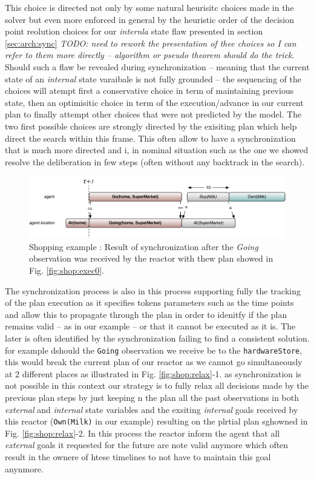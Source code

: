 This choice is directed not only by some natural heurisitc
choices made in the solver but even more enforced in general by the
heuristic order of the decision point reolution choices for our {\em
  internla} state flaw presented in section \ref{sec:arch:sync}
{\em\color{red} TODO: need to rework the presentation of thee choices
  so I can refer to them more directly -- algorithm or pseudo theorem
  should do the trick}. Should such a flaw be revealed during
synchronization -- meaning that the current state of an {\em internal}
state varaibale is not fully grounded -- the sequencing of the choices
will atempt first a conservative choice in term of maintaining
previous state, then an optimisitic choice in term of the
execution/advance in our current plan to finally attempt other choices
that were not predicted by the model. The two first possible choices
are strongly directed by the exisiting plan which help direct the
search within this frame. This often allow to have a synchronization
that is much more directed and i, in nominal situation such as the one
we showed resolve the deliberation in few steps (often without any
backtrack in the search).

\begin{figure}[!htb]
  \centering
  \includegraphics[width=0.7\columnwidth]{figs/shoping_exec_t1}
  \caption{Shopping example : Result of synchronization after the {\em
      Going} observation was received by the reactor with thew plan
    showed in Fig. \ref{fig:shop:exec0}.}
  \label{fig:shop:exec1}
\end{figure}

The synchronization process is also in this process supporting fully
the tracking of the plan execution as it specifies tokens parameters
such as the time points and allow this to propagate through the plan
in order to idenitfy if the plan remains valid -- as in our example --
or that it cannot be executed as it is. The later  is often identified
by the synchronization failing to find a consistent solution. for
example dshould the \texttt{Going} observation we receive be to the 
\texttt{hardwareStore}, this would break the current plan of our
reactor as we cannot go simultaneously at 2 different places as
illustrated in Fig. \ref{fig:shop:relax}-1. as synchronization is not
possible in this context our strategy is to fully relax all decisions
made by the previous plan steps by just keeping n the plan all the
past observations in both {\em external} and {\em internal} state
variables and the exsiting {\em internal} goals received by this
reactor (\texttt{Own(Milk)} in our example) resulting on the plrtial
plan sghowned in Fig. \ref{fig:shop:relax}-2. In this process the
reactor inform the agent that all {\em external} goals it requested
for the future are note valid anymore which often result in the ownere
of htese timelines to not have to maintain this goal anynmore. 

